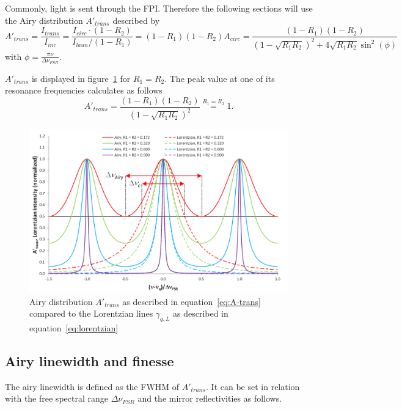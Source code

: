 Commonly, light is sent through the \ac{FPI}. Therefore the following sections will use the Airy distribution $A'_{trans}$ described by
\begin{equation}
\label{eq:A-trans}
A'_{trans} = \frac{I_{trans}}{I_{inc}} = \frac{I_{circ} \cdot (1 - R_2)}{I_{laun} / (1 - R_1)} = (1-R_1)(1-R_2)A_{circ} = \frac{(1-R_1)(1-R_2)}{\left(1-\sqrt{R_1R_2}\right)^2+4\sqrt{R_1R_2}\sin^2(\phi)}
\end{equation}
with $\phi=\frac{\pi\nu}{\Delta \nu_{FSR}}$.

$A'_{trans}$ is displayed in figure~\ref{fig:airydistributionofafabry-perotinterferometer} for $R_1=R_2$. The peak value at one of its resonance frequencies calculates as follows
\begin{equation}
A'_{trans} = \frac{(1-R_1)(1-R_2)}{\left(1-\sqrt{R_1R_2}\right)^2} \stackrel{R_1=R_2}{=} 1. 
\end{equation}

\begin{figure}[h]
	\centering
	\includegraphics[width=0.8\linewidth]{figures/fabry-perot/Airy_distribution_of_a_Fabry-Perot_interferometer}
	\caption[Airy distribution $A'_{trans}$]{Airy distribution $A'_{trans}$ as described in equation~\eqref{eq:A-trans} compared to the Lorentzian lines  $\gamma_{q,L}$ as described in equation~\eqref{eq:lorentzian}}
	\label{fig:airydistributionofafabry-perotinterferometer}
\end{figure}


\subsection{Airy linewidth and finesse}
The airy linewidth is defined as the \ac{FWHM} of $A'_{trans}$. It can be set in relation with the free spectral range $\Delta \nu_{FSR}$ and the mirror reflectivities as follows.

